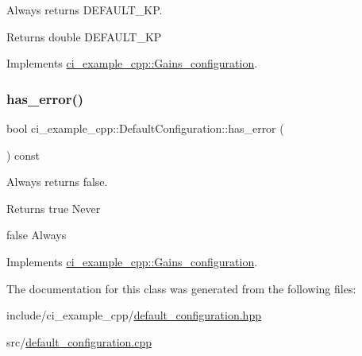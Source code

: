 Always returns D\+E\+F\+A\+U\+L\+T\+\_\+\+KP. 

\begin{DoxyReturn}{Returns}
double D\+E\+F\+A\+U\+L\+T\+\_\+\+KP 
\end{DoxyReturn}


Implements \hyperlink{classci__example__cpp_1_1Gains__configuration_add5ce511c797cd688e12cee09d8ec0b8}{ci\+\_\+example\+\_\+cpp\+::\+Gains\+\_\+configuration}.

\mbox{\label{classci__example__cpp_1_1DefaultConfiguration_aba675295652a7530bbb2148bec700ab0}} 
\subsubsection{\texorpdfstring{has\+\_\+error()}{has\_error()}}
{\footnotesize\ttfamily bool ci\+\_\+example\+\_\+cpp\+::\+Default\+Configuration\+::has\+\_\+error (\begin{DoxyParamCaption}{ }\end{DoxyParamCaption}) const\hspace{0.3cm}{\ttfamily [virtual]}}



Always returns false. 

\begin{DoxyReturn}{Returns}
true Never 

false Always 
\end{DoxyReturn}


Implements \hyperlink{classci__example__cpp_1_1Gains__configuration_ae075925f60288519f8a4fcb477453a66}{ci\+\_\+example\+\_\+cpp\+::\+Gains\+\_\+configuration}.



The documentation for this class was generated from the following files\+:\begin{DoxyCompactItemize}
\item 
include/ci\+\_\+example\+\_\+cpp/\hyperlink{default__configuration_8hpp}{default\+\_\+configuration.\+hpp}\item 
src/\hyperlink{default__configuration_8cpp}{default\+\_\+configuration.\+cpp}\end{DoxyCompactItemize}
